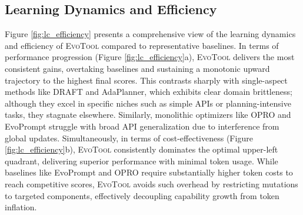 \documentclass[11pt]{article}
\begin{document}












\subsection{Learning Dynamics and Efficiency}






Figure \ref{fig:lc_efficiency} presents a comprehensive view of the learning dynamics and efficiency of \textsc{EvoTool} compared to representative baselines. In terms of performance progression (Figure \ref{fig:lc_efficiency}a), \textsc{EvoTool} delivers the most consistent gains, overtaking baselines and sustaining a monotonic upward trajectory to the highest final scores. This contrasts sharply with single-aspect methods like DRAFT and AdaPlanner, which exhibits clear domain brittleness; although they excel in specific niches such as simple APIs or planning-intensive tasks, they stagnate elsewhere. Similarly, monolithic optimizers like OPRO and EvoPrompt struggle with broad API generalization due to interference from global updates. Simultaneously, in terms of cost-effectiveness (Figure \ref{fig:lc_efficiency}b), \textsc{EvoTool} consistently dominates the optimal upper-left quadrant, delivering superior performance with minimal token usage. While baselines like EvoPrompt and OPRO require substantially higher token costs to reach competitive scores, \textsc{EvoTool} avoids such overhead by restricting mutations to targeted components, effectively decoupling capability growth from token inflation.
\end{document}
